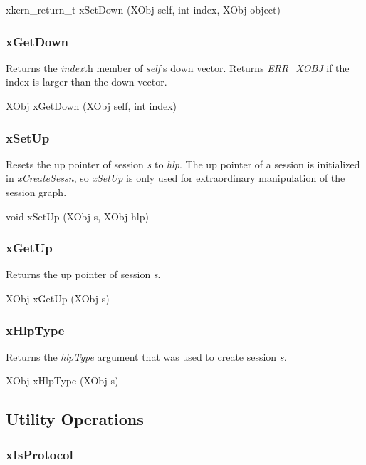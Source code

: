 {\sem xkern\_return\_t} {\bold xSetDown} ({\sem XObj} {\caps self}, {\sem int} {\caps index}, {\sem XObj} {\caps object})

\subsubsection{xGetDown}

Returns the {\em index}th member of {\em self}'s down vector.  Returns
{\em ERR\_XOBJ} if the index is larger than the down vector.
\medskip

{\sem XObj} {\bold xGetDown} ({\sem XObj} {\caps self}, {\sem int} {\caps index})


\subsubsection{xSetUp}

Resets the up pointer of session {\em s} to {\em hlp}.  The up pointer
of a session is initialized in {\em xCreateSessn}, so {\em xSetUp}
is only used for extraordinary manipulation of the session graph.
\medskip

{\sem void} {\bold xSetUp} ({\sem XObj} {\caps s}, {\sem XObj} {\caps hlp})


\subsubsection{xGetUp}

Returns the up pointer of session {\em s}.
\medskip

{\sem XObj} {\bold xGetUp} ({\sem XObj} {\caps s})


\subsubsection{xHlpType}

Returns the {\em hlpType} argument that was used to create session
{\em s.}
\medskip

{\sem XObj} {\bold xHlpType} ({\sem XObj} {\caps s})



\subsection{ Utility Operations }

\subsubsection{xIsProtocol}

